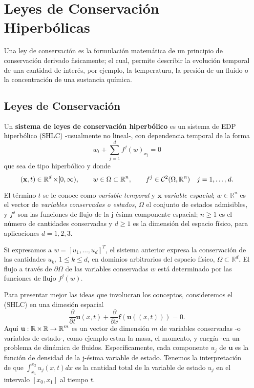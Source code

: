 \chapter{Leyes de Conservación Hiperbólicas}\label{cap:Leyes}

Una ley de conservación es la formulación matemática de un principio de conservación derivado fisicamente; el cual, permite describir la evolución temporal de una cantidad de interés, por ejemplo, la temperatura, la presión de un fluido o la concentración de una sustancia química.

\section{Leyes de Conservación}
Un \textbf{sistema de leyes de conservación  hiperbólico} es un sistema de EDP hiperbólico (SHLC) -usualmente no lineal-, con dependencia temporal de la forma
\[
w_t + \sum_{j=1}^d f^j(w)_{x_j} = 0
\]
que sea de tipo hiperbólico y donde 
\[
(\textbf{x}, t) \in \operatorname{\mathbb R}^d \times [0, \infty), \qquad w \in \Omega \subset \operatorname{\mathbb R}^n, \qquad f^j \in \mathcal{C}^2(\Omega, \operatorname{\mathbb R}^n) \quad j=1,\dots, d.
\]

El término $t$ se le conoce como  \textit{variable temporal} y $\mathbf{x}$ \textit{variable espacial}; $w \in \mathbb{R}^n$ es el vector de \textit{variables conservadas o estados}, $\Omega$ el conjunto de estados admisibles, y $f^j$ son las funciones de flujo de la j-ésima componente espacial;  $n\geq 1$ es el número de cantidades conservadas y $d\geq1$ es la dimensión del espacio físico, para aplicaciones $d=1,2,3$.

Si expresamos a $ w = \left[ u_1, \dots, u_d \right]^T$, el sistema anterior expresa la conservación de las cantidades $u_k$, $1\leq k \leq d$, en dominios arbitrarios del espacio físico, $\Omega \subset \mathbb{R}^d$. El flujo a través de $\partial \Omega$ de las variables conservadas $w$ está determinado por las funciones de flujo $f^j(w)$.

Para presentar mejor las ideas que involucran los conceptos, consideremos el (SHLC) en una dimesión espacial
\[
\frac{\partial}{\partial t} \textbf{u}(x,t) + \frac{\partial}{\partial x} \textbf{f}(\textbf{u}((x,t))) = 0.
\]
Aquí $\textbf{u}:\operatorname{\mathbb R} \times \operatorname{\mathbb R} \rightarrow \operatorname{\mathbb R}^m$ es un vector de dimensión $m$ de variables conservadas -o variables de estado-, como ejemplo estan la masa, el momento, y enegía -en un problema de dinámica de fluidos. Específicamente, cada componente $u_j$ de $\textbf{u}$ es la función de densidad de la j-ésima variable de estado.
Tenemos la interpretación de que $\int_{x_1}^{x_2} u_j(x,t)dx$ es la cantidad total de la variable de estado $u_j$ en el intervalo $[x_0, x_1]$ al tiempo $t$.


